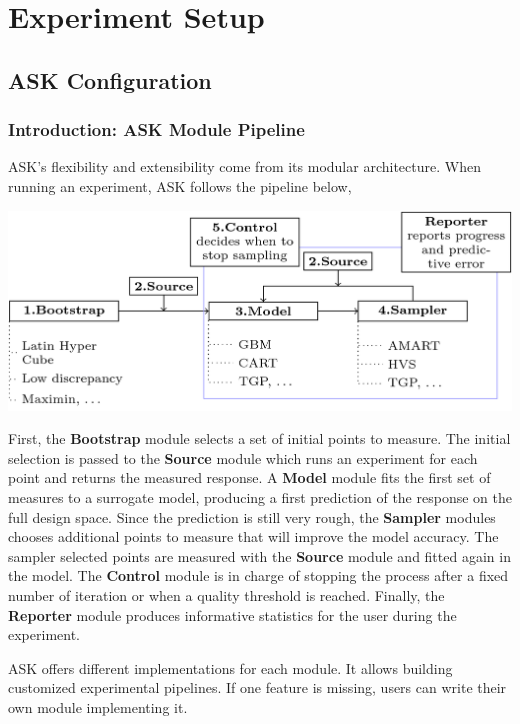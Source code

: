 \chapter{Experiment Setup}
\section{ASK Configuration}

\subsection{Introduction: ASK Module Pipeline}

ASK's flexibility and extensibility come from its modular architecture. When running an experiment, ASK follows the pipeline below,


\begin{center}
  \includegraphics[width=\textwidth]{figures/ASK-modules-pipeline.png}
\end{center}


First, the \textbf{Bootstrap} module selects a set of initial points to measure. The initial selection is passed to the \textbf{Source} module which runs an experiment for each point and returns the measured response. A \textbf{Model} module fits the first set of measures to a surrogate model, producing a first prediction of the response on the full design space. Since the prediction is still very rough, the \textbf{Sampler} modules chooses additional points to measure that will improve the model accuracy. The sampler selected points are measured with the \textbf{Source} module and fitted again in the model.
The \textbf{Control} module is in charge of stopping the process after a fixed number of iteration or when a quality threshold is reached. Finally, the \textbf{Reporter} module produces informative statistics for the user during the experiment.

ASK offers different implementations for each module. It allows building customized experimental pipelines. If one feature is missing, users can write their own module implementing it.

